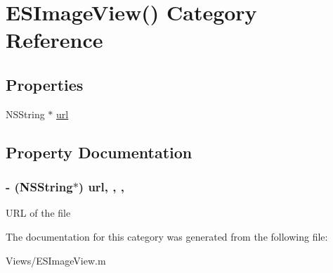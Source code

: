 \hypertarget{category_e_s_image_view_07_08}{}\section{E\+S\+Image\+View() Category Reference}
\label{category_e_s_image_view_07_08}
\subsection*{Properties}
\begin{DoxyCompactItemize}
\item 
N\+S\+String $\ast$ \hyperlink{category_e_s_image_view_07_08_acddf5bb8ee1700bd408251b4b12a5c87}{url}
\end{DoxyCompactItemize}


\subsection{Property Documentation}
\hypertarget{category_e_s_image_view_07_08_acddf5bb8ee1700bd408251b4b12a5c87}{}
\subsubsection[{url}]{\setlength{\rightskip}{0pt plus 5cm}-\/ (N\+S\+String$\ast$) url\hspace{0.3cm}{\ttfamily [read]}, {\ttfamily [write]}, {\ttfamily [nonatomic]}, {\ttfamily [strong]}}\label{category_e_s_image_view_07_08_acddf5bb8ee1700bd408251b4b12a5c87}
U\+R\+L of the file 

The documentation for this category was generated from the following file\+:\begin{DoxyCompactItemize}
\item 
Views/E\+S\+Image\+View.\+m\end{DoxyCompactItemize}
